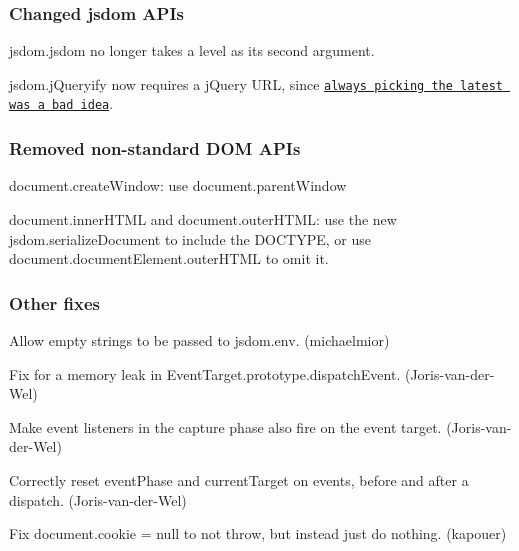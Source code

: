 \subsubsection*{Changed jsdom A\+P\+Is}


\begin{DoxyItemize}
\item {\ttfamily jsdom.\+jsdom} no longer takes a level as its second argument.
\item {\ttfamily jsdom.\+j\+Queryify} now requires a j\+Query U\+RL, since \href{http://blog.jquery.com/2014/07/03/dont-use-jquery-latest-js/}{\tt always picking the latest was a bad idea}.
\end{DoxyItemize}

\subsubsection*{Removed non-\/standard D\+OM A\+P\+Is}


\begin{DoxyItemize}
\item {\ttfamily document.\+create\+Window}\+: use {\ttfamily document.\+parent\+Window}
\item {\ttfamily document.\+inner\+H\+T\+ML} and {\ttfamily document.\+outer\+H\+T\+ML}\+: use the new {\ttfamily jsdom.\+serialize\+Document} to include the D\+O\+C\+T\+Y\+PE, or use {\ttfamily document.\+document\+Element.\+outer\+H\+T\+ML} to omit it.
\end{DoxyItemize}

\subsubsection*{Other fixes}


\begin{DoxyItemize}
\item Allow empty strings to be passed to {\ttfamily jsdom.\+env}. (michaelmior)
\item Fix for a memory leak in {\ttfamily Event\+Target.\+prototype.\+dispatch\+Event}. (Joris-\/van-\/der-\/\+Wel)
\item Make event listeners in the capture phase also fire on the event target. (Joris-\/van-\/der-\/\+Wel)
\item Correctly reset {\ttfamily event\+Phase} and {\ttfamily current\+Target} on events, before and after a dispatch. (Joris-\/van-\/der-\/\+Wel)
\item Fix {\ttfamily document.\+cookie = null} to not throw, but instead just do nothing. (kapouer)
\end{DoxyItemize}

